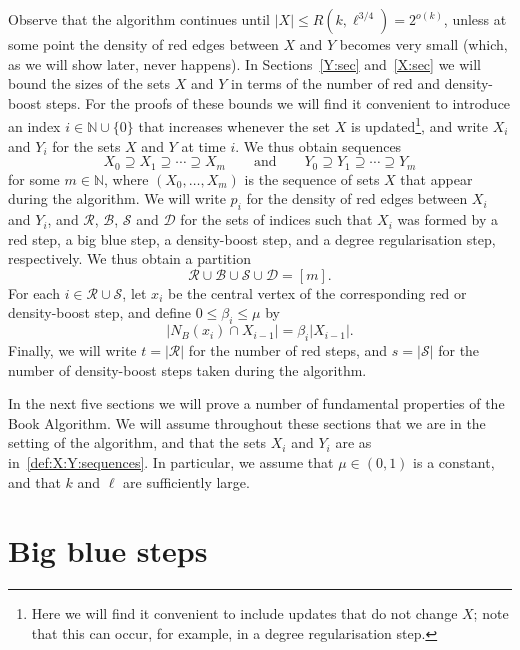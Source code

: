 \documentclass[12pt,reqno]{amsart}
\theoremstyle{definition}
\theoremstyle{remark}
\newcommand\N{\mathbb{N}}
\newcommand\cB{\mathcal{B}}
\def\cS{\mathcal{S}}
\renewcommand{\le}{\leqslant}
\def\N{\mathbb{N}}
\def\cD{\mathcal{D}}
\def\cR{\mathcal{R}}
\def\cB{\mathcal{B}}
\begin{document}
Observe that the algorithm continues until $|X| \le R(k,\ell^{3/4}) = 2^{o(k)}$, unless at some point the density of red edges between $X$ and $Y$ becomes very small (which, as we will show later, never happens). In Sections~\ref{Y:sec} and~\ref{X:sec} we will bound the sizes of the sets $X$ and $Y$ in terms of the number of red and density-boost steps. For the proofs of these bounds we will find it convenient to introduce an index $i \in \N \cup \{0\}$ that increases whenever the set $X$ is updated\footnote{Here we will find it convenient to include updates that do not change $X$; note that this can occur, for example, in a degree regularisation step.}, and write $X_i$ and $Y_i$ for the sets $X$ and $Y$ at time $i$. We thus obtain sequences 
\begin{equation}\label{def:X:Y:sequences}
X_0 \supseteq X_1 \supseteq \cdots \supseteq X_m \qquad \text{and} \qquad Y_0 \supseteq Y_1 \supseteq \cdots \supseteq Y_m
\end{equation}
for some $m \in \N$, where $(X_0,\ldots,X_m)$ is the sequence of sets $X$ that appear during the algorithm. We will write $p_i$ for the density of red edges between $X_i$ and $Y_i$, %
and $\cR$, $\cB$, $\cS$ and $\cD$ for the sets of indices such that $X_i$ was formed by a red step, a big blue step, a density-boost step, and a degree regularisation step, respectively. We thus obtain a partition %
$$\cR \cup \cB \cup \cS \cup \cD = [m].$$
For each $i \in \cR \cup \cS$, let $x_i$ be the central vertex of the corresponding red or density-boost step, and define $0 \le \beta_i \le \mu$ by
\begin{equation}\label{def:beta:is}
|N_B(x_i) \cap X_{i-1}| = \beta_i |X_{i-1}|.
\end{equation}
Finally, we will write $t = |\cR|$ for the number of red steps, and $s = |\cS|$ for the number of density-boost steps taken during the algorithm. 

In the next five sections we will prove a number of fundamental properties of the Book Algorithm. We will assume throughout these sections that we are in the setting of the algorithm, and that the sets $X_i$ and $Y_i$ are as in~\eqref{def:X:Y:sequences}. In particular, we assume that $\mu \in (0,1)$ is a constant, and that $k$ and $\ell$ are sufficiently large. 


\section{Big blue steps}\label{big:blue:sec}
\end{document}
